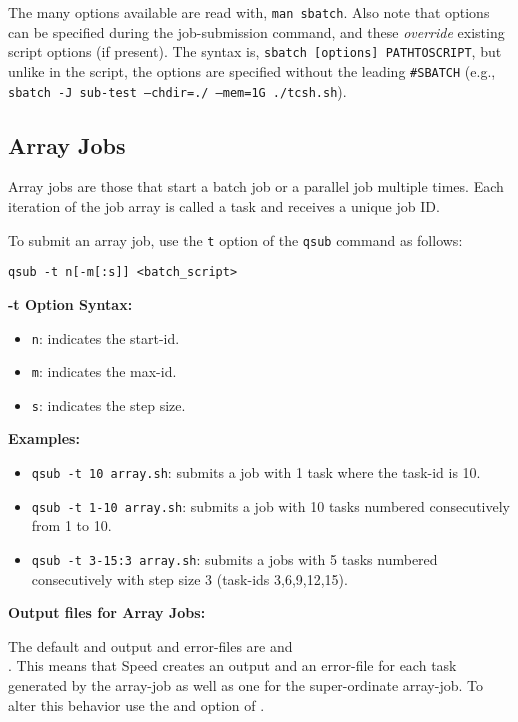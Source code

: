 The many  options available are read with, \texttt{man sbatch}. Also 
note that  options can be specified during the job-submission 
command, and these \emph{override} existing script options (if present). The 
syntax is, \texttt{sbatch [options] PATHTOSCRIPT}, but unlike in the script, 
the options are specified without the leading \verb+#SBATCH+
(e.g., \texttt{sbatch -J sub-test --chdir=./ --mem=1G ./tcsh.sh}).


\subsection{Array Jobs}
\label{sect:array-jobs}

Array jobs are those that start a batch job or a parallel job multiple times. 
Each iteration of the job array is called a task and receives a unique job ID.

To submit an array job, use the \texttt{\-t} option of the \texttt{qsub} 
command as follows:

\begin{verbatim}
qsub -t n[-m[:s]] <batch_script>
\end{verbatim}

\textbf{-t Option Syntax:}
\begin{itemize}
\item
\texttt{n}: indicates the start-id.
\item
\texttt{m}: indicates the max-id.
\item
\texttt{s}: indicates the step size.
\end{itemize}

\textbf{Examples:}
\begin{itemize}
\item
\texttt{qsub -t 10 array.sh}: submits a job with 1 task where the task-id is 10. 
\item
\texttt{qsub -t 1-10 array.sh}: submits a job with 10 tasks numbered consecutively from 1 to 10.
\item
\texttt{qsub -t 3-15:3 array.sh}: submits a jobs with 5 tasks numbered consecutively with step size 3
(task-ids 3,6,9,12,15).
\end{itemize}

\textbf{Output files for Array Jobs:}

The default and output and error-files are  and\\
.
%
This means that Speed creates an output and an error-file for each task 
generated by the array-job as well as one for the super-ordinate array-job. 
To alter this behavior use the  and  option of
. 

